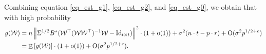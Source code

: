 	Combining equation \eqref{eq_est_g1}, \eqref{eq_est_g2}, and \eqref{eq_est_g0}, we obtain that with high probability
	\begin{align}
	g(\mathcal W)&= n \left\| \Sigma^{1/2} B^{\star} ({\mathcal W}^{\top} ({\mathcal W} {\mathcal W}^{\top})^{-1} {\mathcal W} - \operatorname{Id}_{t\times t}) \right\|^2 \cdot (1+\operatorname{o}(1)) + \sigma^2 (n\cdot t - p \cdot r)+\operatorname{O}(\sigma^2 p^{1/2+{\mathit{e}}}) \nonumber \\
	&=\mathop{\mathbb{E}}\left[ g({\mathcal W}) \right] \cdot (1+\operatorname{o}(1)) + \operatorname{O}(\sigma^2 p^{1/2+{\mathit{e}}}). \label{eq_est_g}
	\end{align}
